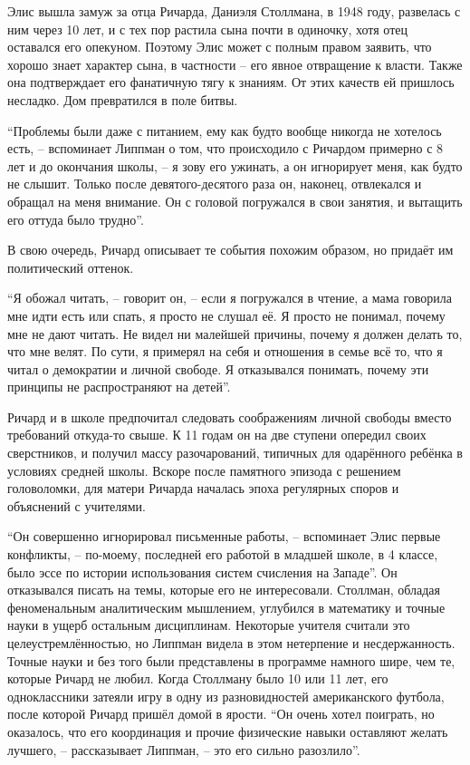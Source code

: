 Элис вышла замуж за отца Ричарда, Даниэля Столлмана, в 1948 году, развелась с ним через 10 лет, и с тех пор растила сына почти в одиночку, хотя отец оставался его опекуном. Поэтому Элис может с полным правом заявить, что хорошо знает характер сына, в частности -- его явное отвращение к власти. Также она подтверждает его фанатичную тягу к знаниям. От этих качеств ей пришлось несладко. Дом превратился в поле битвы.

\enquote{Проблемы были даже с питанием, ему как будто вообще никогда не хотелось есть, -- вспоминает Липпман о том, что происходило с Ричардом примерно с 8 лет и до окончания школы, -- я зову его ужинать, а он игнорирует меня, как будто не слышит. Только после девятого-десятого раза он, наконец, отвлекался и обращал на меня внимание. Он с головой погружался в свои занятия, и вытащить его оттуда было трудно}.

В свою очередь, Ричард описывает те события похожим образом, но придаёт им политический оттенок.

\enquote{Я обожал читать, -- говорит он, -- если я погружался в чтение, а мама говорила мне идти есть или спать, я просто не слушал её. Я просто не понимал, почему мне не дают читать. Не видел ни малейшей причины, почему я должен делать то, что мне велят. По сути, я примерял на себя и отношения в семье всё то, что я читал о демократии и личной свободе. Я отказывался понимать, почему эти принципы не распространяют на детей}.

Ричард и в школе предпочитал следовать соображениям личной свободы вместо требований откуда-то свыше. К 11 годам он на две ступени опередил своих сверстников, и получил массу разочарований, типичных для одарённого ребёнка в условиях средней школы. Вскоре после памятного эпизода с решением головоломки, для матери Ричарда началась эпоха регулярных споров и объяснений с учителями.

\enquote{Он совершенно игнорировал письменные работы, -- вспоминает Элис первые конфликты, -- по-моему, последней его работой в младшей школе, в 4 классе, было эссе по истории использования систем счисления на Западе}. Он отказывался писать на темы, которые его не интересовали. Столлман, обладая феноменальным аналитическим мышлением, углубился в математику и точные науки в ущерб остальным дисциплинам. Некоторые учителя считали это целеустремлённостью, но Липпман видела в этом нетерпение и несдержанность. Точные науки и без того были представлены в программе намного шире, чем те, которые Ричард не любил. Когда Столлману было 10 или 11 лет, его одноклассники затеяли игру в одну из разновидностей американского футбола, после которой Ричард пришёл домой в ярости. \enquote{Он очень хотел поиграть, но оказалось, что его координация и прочие физические навыки оставляют желать лучшего, -- рассказывает Липпман, -- это его сильно разозлило}.

